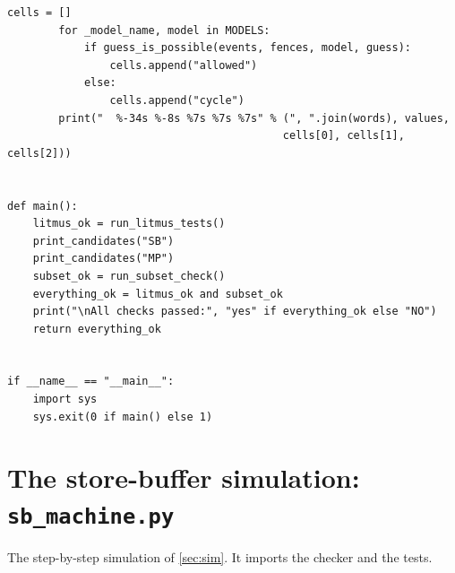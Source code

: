 \begin{lstlisting}[style=vspython]
        cells = []
        for _model_name, model in MODELS:
            if guess_is_possible(events, fences, model, guess):
                cells.append("allowed")
            else:
                cells.append("cycle")
        print("  %-34s %-8s %7s %7s %7s" % (", ".join(words), values,
                                           cells[0], cells[1], cells[2]))


def main():
    litmus_ok = run_litmus_tests()
    print_candidates("SB")
    print_candidates("MP")
    subset_ok = run_subset_check()
    everything_ok = litmus_ok and subset_ok
    print("\nAll checks passed:", "yes" if everything_ok else "NO")
    return everything_ok


if __name__ == "__main__":
    import sys
    sys.exit(0 if main() else 1)
\end{lstlisting}

\section{The store-buffer simulation: \texttt{sb\_machine.py}}
The step-by-step simulation of \cref{sec:sim}. It imports the checker and the tests.


